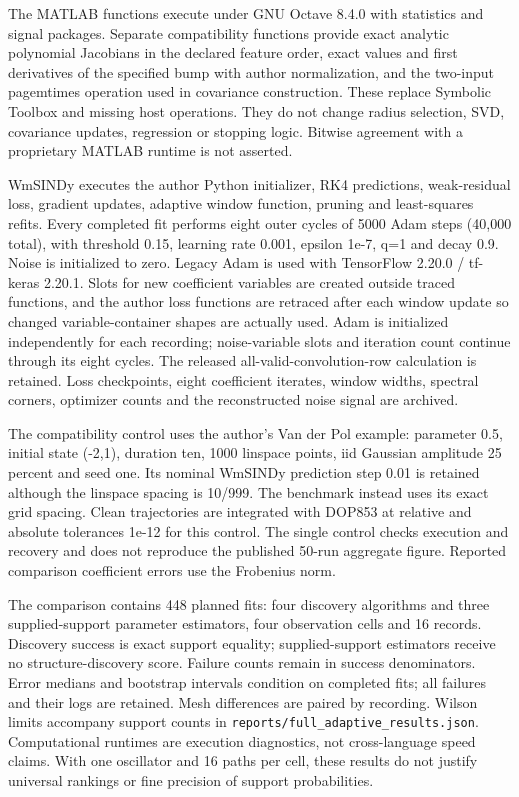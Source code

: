 \documentclass[
  american,
  11pt,
]{article}
\begin{document}
The MATLAB functions execute under GNU Octave 8.4.0 with statistics and
signal packages. Separate compatibility functions provide exact analytic
polynomial Jacobians in the declared feature order, exact values and
first derivatives of the specified bump with author normalization, and
the two-input pagemtimes operation used in covariance construction.
These replace Symbolic Toolbox and missing host operations. They do not
change radius selection, SVD, covariance updates, regression or stopping
logic. Bitwise agreement with a proprietary MATLAB runtime is not
asserted.

WmSINDy executes the author Python initializer, RK4 predictions,
weak-residual loss, gradient updates, adaptive window function, pruning
and least-squares refits. Every completed fit performs eight outer
cycles of 5000 Adam steps (40,000 total), with threshold 0.15, learning
rate 0.001, epsilon 1e-7, q=1 and decay 0.9. Noise is initialized to
zero. Legacy Adam is used with TensorFlow 2.20.0 / tf-keras 2.20.1.
Slots for new coefficient variables are created outside traced
functions, and the author loss functions are retraced after each window
update so changed variable-container shapes are actually used. Adam is
initialized independently for each recording; noise-variable slots and
iteration count continue through its eight cycles. The released
all-valid-convolution-row calculation is retained. Loss checkpoints,
eight coefficient iterates, window widths, spectral corners, optimizer
counts and the reconstructed noise signal are archived.

The compatibility control uses the author's Van der Pol example:
parameter 0.5, initial state (-2,1), duration ten, 1000 linspace points,
iid Gaussian amplitude 25 percent and seed one. Its nominal WmSINDy
prediction step 0.01 is retained although the linspace spacing is
10/999. The benchmark instead uses its exact grid spacing. Clean
trajectories are integrated with DOP853 at relative and absolute
tolerances 1e-12 for this control. The single control checks execution
and recovery and does not reproduce the published 50-run aggregate
figure. Reported comparison coefficient errors use the Frobenius norm.

The comparison contains 448 planned fits: four discovery algorithms and
three supplied-support parameter estimators, four observation cells and
16 records. Discovery success is exact support equality;
supplied-support estimators receive no structure-discovery score.
Failure counts remain in success denominators. Error medians and
bootstrap intervals condition on completed fits; all failures and their
logs are retained. Mesh differences are paired by recording. Wilson
limits accompany support counts in
\texttt{reports/full\_adaptive\_results.json}. Computational runtimes
are execution diagnostics, not cross-language speed claims. With one
oscillator and 16 paths per cell, these results do not justify universal
rankings or fine precision of support probabilities.
\end{document}
